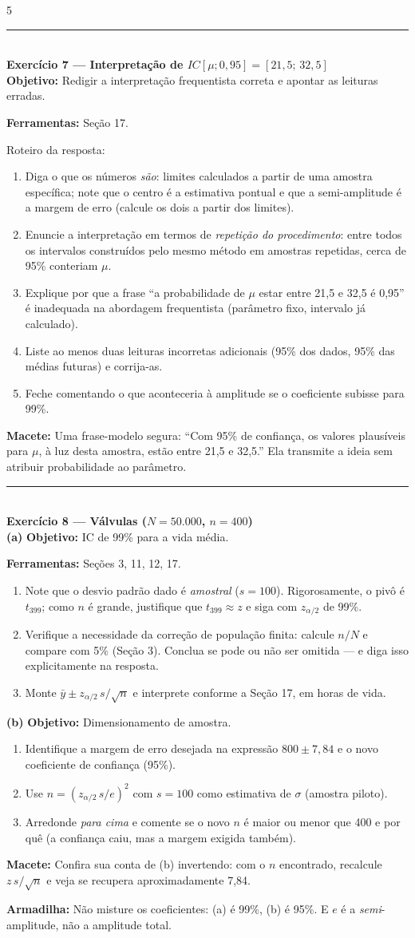 \documentclass[a4paper,8pt]{extarticle}
\newcommand{\tit}[1]{\vspace{2pt}\textcolor{azul}{\rule{\linewidth}{0.6pt}}\\[1pt]\textbf{\textcolor{azul}{#1}}\\[1pt]}
\newcommand{\mac}[1]{\textcolor{verde}{\textbf{Macete:}} #1\par}
\newcommand{\arm}[1]{\textcolor{vinho}{\textbf{Armadilha:}} #1\par}
\newcommand{\ferr}[1]{\textbf{Ferramentas:} #1\par}
\newcommand{\obj}[1]{\textbf{Objetivo:} #1\par}
\begin{document}
\begin{multicols*}{5}
\tit{Exercício 7 — Interpretação de $IC[\mu;0{,}95]=[21{,}5;\,32{,}5]$}
\obj{Redigir a interpretação frequentista correta e apontar as leituras erradas.}
\ferr{Seção 17.}
Roteiro da resposta:
\begin{enumerate}
\item Diga o que os números \emph{são}: limites calculados a partir de uma amostra específica; note que o centro é a estimativa pontual e que a semi-amplitude é a margem de erro (calcule os dois a partir dos limites).
\item Enuncie a interpretação em termos de \emph{repetição do procedimento}: entre todos os intervalos construídos pelo mesmo método em amostras repetidas, cerca de 95\% conteriam $\mu$.
\item Explique por que a frase “a probabilidade de $\mu$ estar entre 21,5 e 32,5 é 0,95” é inadequada na abordagem frequentista (parâmetro fixo, intervalo já calculado).
\item Liste ao menos duas leituras incorretas adicionais (95\% dos dados, 95\% das médias futuras) e corrija-as.
\item Feche comentando o que aconteceria à amplitude se o coeficiente subisse para 99\%.
\end{enumerate}
\mac{Uma frase-modelo segura: “Com 95\% de confiança, os valores plausíveis para $\mu$, à luz desta amostra, estão entre 21,5 e 32,5.” Ela transmite a ideia sem atribuir probabilidade ao parâmetro.}

\tit{Exercício 8 — Válvulas ($N=50.000$, $n=400$)}
\textbf{(a)} \obj{IC de 99\% para a vida média.}
\ferr{Seções 3, 11, 12, 17.}
\begin{enumerate}
\item Note que o desvio padrão dado é \emph{amostral} ($s=100$). Rigorosamente, o pivô é $t_{399}$; como $n$ é grande, justifique que $t_{399}\approx z$ e siga com $z_{\alpha/2}$ de 99\%.
\item Verifique a necessidade da correção de população finita: calcule $n/N$ e compare com 5\% (Seção 3). Conclua se pode ou não ser omitida — e diga isso explicitamente na resposta.
\item Monte $\bar y \pm z_{\alpha/2}\, s/\sqrt n$ e interprete conforme a Seção 17, em horas de vida.
\end{enumerate}
\textbf{(b)} \obj{Dimensionamento de amostra.}
\begin{enumerate}
\item Identifique a margem de erro desejada na expressão $800\pm 7{,}84$ e o novo coeficiente de confiança (95\%).
\item Use $n=(z_{\alpha/2}\,s/e)^2$ com $s=100$ como estimativa de $\sigma$ (amostra piloto).
\item Arredonde \emph{para cima} e comente se o novo $n$ é maior ou menor que 400 e por quê (a confiança caiu, mas a margem exigida também).
\end{enumerate}
\mac{Confira sua conta de (b) invertendo: com o $n$ encontrado, recalcule $z\,s/\sqrt n$ e veja se recupera aproximadamente 7,84.}
\arm{Não misture os coeficientes: (a) é 99\%, (b) é 95\%. E $e$ é a \emph{semi}-amplitude, não a amplitude total.}


\end{multicols*}
\end{document}
